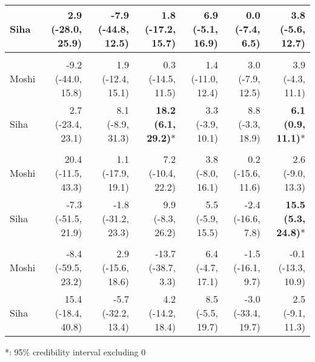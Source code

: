 \begin{table}[t]
\begin{tabular*}{\linewidth}{@{\extracolsep{\fill}}l|rrrrrr}
Siha & 2.9 (-28.0, 25.9) & -7.9 (-44.8, 12.5) & 1.8 (-17.2, 15.7) & 6.9 (-5.1, 16.9) & 0.0 (-7.4, 6.5) & 3.8 (-5.6, 12.7) \\ 
\midrule\addlinespace[2.5pt]
\multicolumn{7}{l}{Urinary Tract Infections} \\[2.5pt] 
\midrule\addlinespace[2.5pt]
Moshi & -9.2 (-44.0, 15.8) & 1.9 (-12.4, 15.1) & 0.3 (-14.5, 11.5) & 1.4 (-11.0, 12.4) & 3.0 (-7.9, 12.5) & 3.9 (-4.3, 11.1) \\ 
Siha & 2.7 (-23.4, 23.1) & 8.1 (-8.9, 31.3) & \textbf{18.2 (6.1, 29.2)}* & 3.3 (-3.9, 10.1) & 8.8 (-3.3, 18.9) & \textbf{6.1 (0.9, 11.1)}* \\ 
\midrule\addlinespace[2.5pt]
\multicolumn{7}{l}{Malaria} \\[2.5pt] 
\midrule\addlinespace[2.5pt]
Moshi & 20.4 (-11.5, 43.3) & 1.1 (-17.9, 19.1) & 7.2 (-10.4, 22.2) & 3.8 (-8.0, 16.1) & 0.2 (-15.6, 11.6) & 2.6 (-9.0, 13.3) \\ 
Siha & -7.3 (-51.5, 21.9) & -1.8 (-31.2, 23.3) & 9.9 (-8.3, 26.2) & 5.5 (-5.9, 15.5) & -2.4 (-16.6, 7.8) & \textbf{15.5 (5.3, 24.8)}* \\ 
\midrule\addlinespace[2.5pt]
\multicolumn{7}{l}{Infectious Eye Disease} \\[2.5pt] 
\midrule\addlinespace[2.5pt]
Moshi & -8.4 (-59.5, 23.2) & 2.9 (-15.6, 18.6) & -13.7 (-38.7, 3.3) & 6.4 (-4.7, 17.1) & -1.5 (-16.1, 9.7) & -0.1 (-13.3, 10.9) \\ 
Siha & 15.4 (-18.4, 40.8) & -5.7 (-32.2, 13.4) & 4.2 (-14.2, 18.4) & 8.5 (-5.5, 19.7) & -3.0 (-33.4, 19.7) & 2.5 (-9.1, 11.3) \\ 
\bottomrule
\end{tabular*}
\begin{minipage}{\linewidth}
*: 95\% credibility interval excluding 0\\
\end{minipage}
\end{table}


